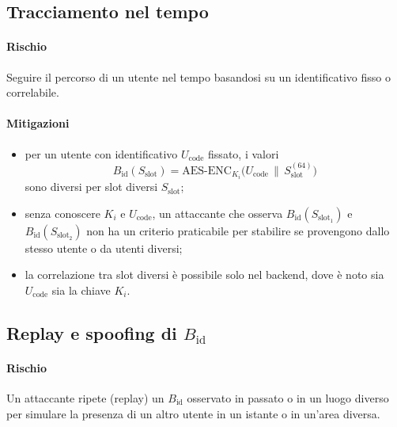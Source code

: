 \documentclass[a4paper,11pt]{article}
\begin{document}
\subsection{Tracciamento nel tempo}
\paragraph{Rischio}
Seguire il percorso di un utente nel tempo basandosi su un identificativo fisso o correlabile.

\paragraph{Mitigazioni}
\begin{itemize}
  \item per un utente con identificativo \(U_{\text{code}}\) fissato, i valori
        \[
          B_{\text{id}}(S_{\text{slot}}) =
          \mathrm{AES\text{-}ENC}_{K_i}\bigl(U_{\text{code}} \,\|\, S_{\text{slot}}^{(64)}\bigr)
        \]
        sono diversi per slot diversi \(S_{\text{slot}}\);
  \item senza conoscere \(K_i\) e \(U_{\text{code}}\), un attaccante che osserva
        \(B_{\text{id}}(S_{\text{slot}_1})\) e \(B_{\text{id}}(S_{\text{slot}_2})\) non ha
        un criterio praticabile per stabilire se provengono dallo stesso utente o da utenti diversi;
  \item la correlazione tra slot diversi è possibile solo nel backend, dove è noto sia
        \(U_{\text{code}}\) sia la chiave \(K_i\).
\end{itemize}

\subsection{Replay e spoofing di \(B_{\text{id}}\)}
\paragraph{Rischio}
Un attaccante ripete (replay) un \(B_{\text{id}}\) osservato in passato o in un luogo diverso per
simulare la presenza di un altro utente in un istante o in un’area diversa.
\end{document}
